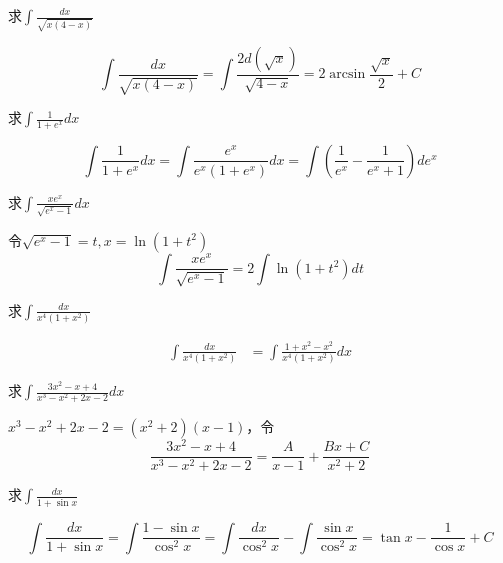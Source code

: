 \documentclass{article}
\begin{document}
\begin{examplle}[]
求\(\displaystyle\int\frac{dx}{\sqrt{x(4-x)}}\)

\begin{equation*}
\int\frac{dx}{\sqrt{x(4-x)}}=
\int\frac{2d(\sqrt{x})}{\sqrt{4-x}}=2\arcsin\frac{\sqrt{x}}{2}+C
\end{equation*}
\end{examplle}

\begin{examplle}[]
求\(\displaystyle\int\frac{1}{1+e^x}dx\)

\begin{equation*}
\int\frac{1}{1+e^x}dx=\int\frac{e^x}{e^x(1+e^x)}dx=
\int\left(\frac{1}{e^x}-\frac{1}{e^x+1}\right)de^x
\end{equation*}
\end{examplle}

\begin{examplle}[]
求\(\displaystyle\int\frac{xe^x}{\sqrt{e^x-1}}dx\)

令\(\sqrt{e^x-1}=t,x=\ln(1+t^2)\)
\begin{equation*}
\int\frac{xe^x}{\sqrt{e^x-1}}=2\int\ln(1+t^2)dt
\end{equation*}
\end{examplle}


\begin{examplle}[]
求\(\displaystyle\int\frac{dx}{x^4(1+x^2)}\)

\begin{align*}
\int\frac{dx}{x^4(1+x^2)}&=
\int\frac{1+x^2-x^2}{x^4(1+x^2)}dx
\end{align*}
\end{examplle}

\begin{examplle}[]
求\(\displaystyle\int\frac{3x^2-x+4}{x^3-x^2+2x-2}dx\)

\(x^3-x^2+2x-2=(x^2+2)(x-1)\)，令
\begin{equation*}
\frac{3x^2-x+4}{x^3-x^2+2x-2}=
\frac{A}{x-1}+\frac{Bx+C}{x^2+2}
\end{equation*}
\end{examplle}

\begin{examplle}[]
求\(\displaystyle\int\frac{dx}{1+\sin x}\)

\begin{equation*}
\int\frac{dx}{1+\sin x}=\int\frac{1-\sin x}{\cos^2 x}=
\int\frac{dx}{\cos^2x}-\int\frac{\sin x}{\cos^2 x}=\tan x-\frac{1}{\cos x}+C
\end{equation*}
\end{examplle}
\end{document}
